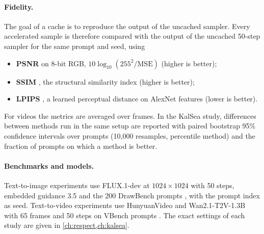\paragraph{Fidelity.} The goal of a cache is to reproduce the output of the uncached sampler. Every accelerated sample is therefore compared with the output of the uncached 50-step sampler for the same prompt and seed, using
\begin{itemize}
  \item \textbf{PSNR} on 8-bit RGB, $10\log_{10}(255^2/\mathrm{MSE})$ (higher is better);
  \item \textbf{SSIM} \citep{wang2004ssim}, the structural similarity index (higher is better);
  \item \textbf{LPIPS} \citep{zhang2018lpips}, a learned perceptual distance on AlexNet features (lower is better).
\end{itemize}
For videos the metrics are averaged over frames. In the KalSea study, differences between methods run in the same setup are reported with paired bootstrap 95\% confidence intervals over prompts (10{,}000 resamples, percentile method) and the fraction of prompts on which a method is better.

\paragraph{Benchmarks and models.} Text-to-image experiments use FLUX.1-dev \citep{bfl2024flux} at $1024\times1024$ with 50 steps, embedded guidance 3.5 and the 200 DrawBench prompts \citep{saharia2022imagen}, with the prompt index as seed. Text-to-video experiments use HunyuanVideo \citep{kong2024hunyuanvideo} and Wan2.1-T2V-1.3B \citep{wan2025wan} with 65 frames and 50 steps on VBench prompts \citep{huang2024vbench}. The exact settings of each study are given in \cref{ch:respect,ch:kalsea}.
